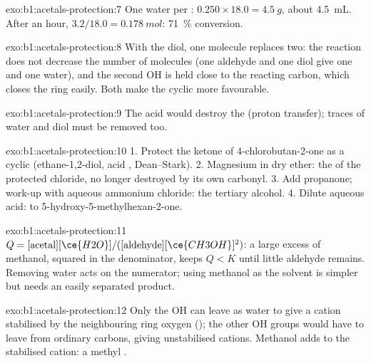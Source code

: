 \begin{solution}{exo:b1:acetals-protection:7}
One water per : $0.250 \times 18.0 = \qty{4.5}{g}$, about
\qty{4.5}{mL}. After an hour, $3.2/18.0 = \qty{0.178}{mol}$: \qty{71}{\percent}
conversion.
\end{solution}

\begin{solution}{exo:b1:acetals-protection:8}
With the diol, one molecule replaces two: the reaction does not decrease
the number of molecules (one aldehyde and one diol give one  and one
water), and the second OH is held close to the reacting carbon, which
closes the ring easily. Both make the cyclic  more favourable.
\end{solution}

\begin{solution}{exo:b1:acetals-protection:9}
The acid would destroy the  (proton transfer); traces of
water and diol must be removed too.
\end{solution}

\begin{solution}{exo:b1:acetals-protection:10}
1. Protect the ketone of 4-chlorobutan-2-one as a cyclic 
(ethane-1,2-diol, acid , Dean--Stark). 2. Magnesium in dry ether:
the  of the protected chloride, no longer destroyed by its
own carbonyl. 3. Add propanone; work-up with aqueous ammonium chloride:
the tertiary alcohol. 4. Dilute aqueous acid:  to
5-hydroxy-5-methylhexan-2-one.
\end{solution}

\begin{solution}{exo:b1:acetals-protection:11}
$Q = [\text{acetal}][\ce{H2O}]/([\text{aldehyde}][\ce{CH3OH}]^2)$: a large
excess of methanol, squared in the denominator, keeps $Q < K$ until little
aldehyde remains. Removing water acts on the numerator; using methanol as
the solvent is simpler but needs an easily separated product.
\end{solution}

\begin{solution}{exo:b1:acetals-protection:12}
Only the  OH can leave as water to give a cation stabilised by
the neighbouring ring oxygen (); the other OH groups would have to
leave from ordinary carbons, giving unstabilised cations. Methanol adds
to the stabilised cation: a methyl .
\end{solution}

